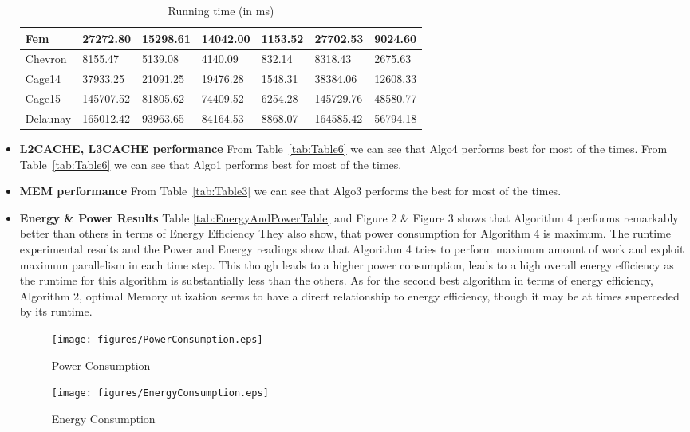 \begin{itemize}
\begin{table}[th]
\begin{center}
\begin{tabular}{| l | l | l | l | l | l | l |}
	Fem & 27272.80 & 15298.61 & 14042.00 & \cellcolor{blue!25} 1153.52 & 27702.53 & 9024.60\\ \hline
	Chevron & 8155.47 & 5139.08 & 4140.09 & \cellcolor{blue!25} 832.14 & 8318.43 & 2675.63\\ \hline
	Cage14 & 37933.25 & 21091.25 & 19476.28 & \cellcolor{blue!25} 1548.31 & 38384.06 & 12608.33\\ \hline
	Cage15 & 145707.52 & 81805.62 & 74409.52 & \cellcolor{blue!25} 6254.28 & 145729.76 & 48580.77\\ \hline
	Delaunay & 165012.42 & 93963.65 & 84164.53 & \cellcolor{blue!25} 8868.07 & 164585.42 & 56794.18\\ \hline
    \end{tabular}
\end{center}
\caption{\capfont Running time (in ms)}
\label{tab:RuntimeTable}
\end{table}
\item
\textbf{L2CACHE, L3CACHE performance}
From Table~\ref{tab:Table6} we can see that Algo4 performs best for
most of the times.  From Table~\ref{tab:Table6} we can see that Algo1 performs best for
most of the times.
\item
\textbf{MEM performance}
From Table~\ref{tab:Table3} we can see that Algo3 performs the best
for most of the times.
\item
\textbf{Energy \& Power Results}
Table \ref{tab:EnergyAndPowerTable} and Figure 2 \& Figure 3 shows 
that Algorithm 4 performs remarkably better than others in terms of Energy Efficiency 
They also show, that power consumption for Algorithm 4 is maximum. The runtime
experimental results and the Power and Energy readings show that Algorithm 4 tries to perform
maximum amount of work and exploit maximum parallelism in each time step. This though 
leads to a higher power consumption, leads to a high overall energy efficiency 
as the runtime for this algorithm is substantially less than the others.
As for the second best algorithm in terms of energy efficiency, Algorithm 2,
optimal Memory utlization seems to have a direct relationship to energy efficiency,
though it may be at times superceded by its runtime.
\begin{figure}[t]
    \centering
    \texttt{[image: figures/PowerConsumption.eps]}
    \caption{Power Consumption}
    \label{fig:Power Consumption}
\end{figure}
\begin{figure}[t]
    \centering
    \texttt{[image: figures/EnergyConsumption.eps]}
    \caption{Energy Consumption}

\end{figure}
\end{itemize}
